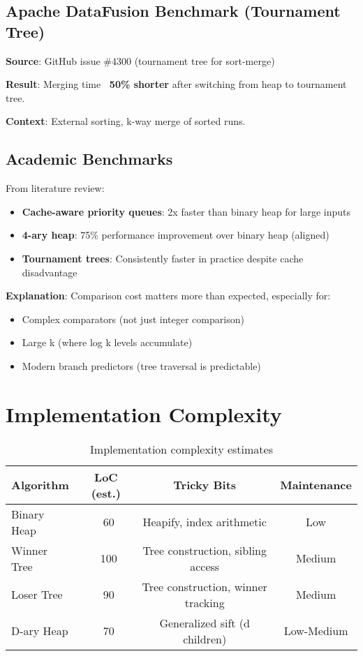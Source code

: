 \documentclass[11pt]{article}
\begin{document}
\subsection{Apache DataFusion Benchmark (Tournament Tree)}

\textbf{Source}: GitHub issue \#4300 (tournament tree for sort-merge)

\textbf{Result}: Merging time \textbf{~50\% shorter} after switching from heap to tournament tree.

\textbf{Context}: External sorting, k-way merge of sorted runs.

\subsection{Academic Benchmarks}

From literature review:
\begin{itemize}
    \item \textbf{Cache-aware priority queues}: 2x faster than binary heap for large inputs
    \item \textbf{4-ary heap}: 75\% performance improvement over binary heap (aligned)
    \item \textbf{Tournament trees}: Consistently faster in practice despite cache disadvantage
\end{itemize}

\textbf{Explanation}: Comparison cost matters more than expected, especially for:
\begin{itemize}
    \item Complex comparators (not just integer comparison)
    \item Large k (where log k levels accumulate)
    \item Modern branch predictors (tree traversal is predictable)
\end{itemize}

\section{Implementation Complexity}

\begin{table}[h]
\centering
\begin{tabular}{lccc}
\toprule
\textbf{Algorithm} & \textbf{LoC (est.)} & \textbf{Tricky Bits} & \textbf{Maintenance} \\
\midrule
Binary Heap & ~60 & Heapify, index arithmetic & Low \\
Winner Tree & ~100 & Tree construction, sibling access & Medium \\
Loser Tree & ~90 & Tree construction, winner tracking & Medium \\
D-ary Heap & ~70 & Generalized sift (d children) & Low-Medium \\
\bottomrule
\end{tabular}
\caption{Implementation complexity estimates}
\end{table}
\end{document}
